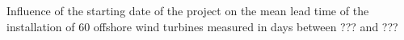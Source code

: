 \label{fig:comparison}
Influence of the starting date of the project on the mean lead time of the installation of 60 offshore wind turbines measured in days between ??? and ???